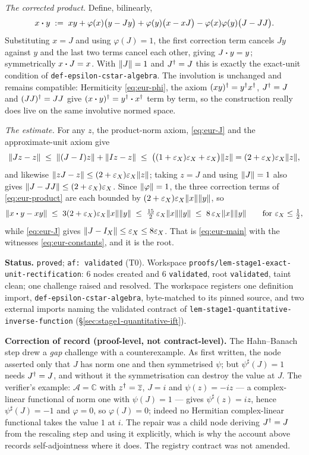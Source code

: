 \emph{The corrected product.} Define, bilinearly,
\begin{equation}\label{eq:eur-product}
  x\mathbin{\bm{\cdot}} y\;:=\;xy+\varphi(x)\bigl(y-Jy\bigr)+\varphi(y)\bigl(x-xJ\bigr)
              -\varphi(x)\varphi(y)\bigl(J-JJ\bigr).
\end{equation}
Substituting $x=J$ and using $\varphi(J)=1$, the first correction term cancels $Jy$ against
$y$ and the last two terms cancel each other, giving $J\mathbin{\bm{\cdot}} y=y$; symmetrically
$x\mathbin{\bm{\cdot}} J=x$. With $\lVert J\rVert=1$ and $J^{\dagger}=J$ this is exactly the exact-unit condition of
\texttt{def-epsilon-cstar-algebra}. The involution is unchanged and remains compatible:
Hermiticity \eqref{eq:eur-phi}, the axiom $(xy)^{\dagger}=y^{\dagger} x^{\dagger}$, $J^{\dagger}=J$ and
$(JJ)^{\dagger}=JJ$ give $(x\mathbin{\bm{\cdot}} y)^{\dagger}=y^{\dagger}\mathbin{\bm{\cdot}} x^{\dagger}$ term by term, so the construction really
does live on the same involutive normed space.

\emph{The estimate.} For any $z$, the product-norm axiom, \eqref{eq:eur-J} and the
approximate-unit axiom give
\[
  \lVert Jz-z\rVert\;\le\;\lVert (J-I)z\rVert+\lVert Iz-z\rVert
  \;\le\;\bigl((1+\varepsilon_X)\varepsilon_X+\varepsilon_X\bigr)\lVert z\rVert=(2+\varepsilon_X)\varepsilon_X\lVert z\rVert,
\]
and likewise $\lVert zJ-z\rVert\le(2+\varepsilon_X)\varepsilon_X\lVert z\rVert$; taking $z=J$ and using $\lVert J\rVert=1$ also
gives $\lVert J-JJ\rVert\le(2+\varepsilon_X)\varepsilon_X$. Since $\lVert \varphi\rVert=1$, the three correction terms of
\eqref{eq:eur-product} are each bounded by $(2+\varepsilon_X)\varepsilon_X\lVert x\rVert\lVert y\rVert$, so
\[
  \lVert x\mathbin{\bm{\cdot}} y-xy\rVert\;\le\;3(2+\varepsilon_X)\varepsilon_X\lVert x\rVert\lVert y\rVert
  \;\le\;\tfrac{15}{2}\,\varepsilon_X\lVert x\rVert\lVert y\rVert\;\le\;8\,\varepsilon_X\lVert x\rVert\lVert y\rVert
  \qquad\text{for }\varepsilon_X\le\tfrac12 ,
\]
while \eqref{eq:eur-J} gives $\lVert J-I_X\rVert\le\varepsilon_X\le8\varepsilon_X$. That is \eqref{eq:eur-main}
with the witnesses \eqref{eq:eur-constants}, and it is the root.

\medskip
\noindent\textbf{Status.} \texttt{proved}; \texttt{af: validated} (T0). Workspace
\texttt{proofs/lem-stage1-exact-unit-rectification}: 6 nodes created and 6 \texttt{validated},
root \texttt{validated}, taint clean; one challenge raised and resolved. The workspace
registers one definition import, \texttt{def-epsilon-cstar-algebra}, byte-matched to its
pinned source, and two external imports naming the validated contract of
\texttt{lem-stage1-quantitative-inverse-function} (\S\ref{sec:stage1-quantitative-ift}).

\noindent\textbf{Correction of record (proof-level, not contract-level).} The Hahn--Banach
step drew a \emph{gap} challenge with a counterexample. As first written, the node asserted
only that $J$ has norm one and then symmetrised $\psi$; but $\psi^{\sharp}(J)=1$ needs
$J^{\dagger}=J$, and without it the symmetrisation can destroy the value at $J$. The verifier's
example: $\mathcal A=\mathbb C$ with $z^{\dagger}=\overline z$, $J=i$ and $\psi(z)=-iz$ --- a
complex-linear functional of norm one with $\psi(J)=1$ --- gives $\psi^{\sharp}(z)=iz$,
hence $\psi^{\sharp}(J)=-1$ and $\varphi=0$, so $\varphi(J)=0$; indeed no Hermitian
complex-linear functional takes the value $1$ at $i$. The repair was a child node deriving
$J^{\dagger}=J$ from the rescaling step and using it explicitly, which is why the account above
records self-adjointness where it does. The registry contract was not amended.


